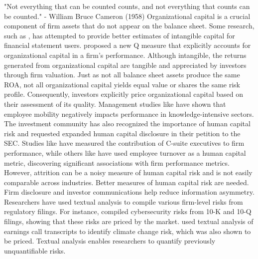 \documentclass[a4paper, 10pt, authoryear]{elsarticle}
\begin{document}
"Not everything that can be counted counts, and not everything that counts can be counted." - William Bruce Cameron (1958)
\newline
Organizational capital is a crucial component of firm assets that do not appear on the balance sheet. Some research, such as \cite{iqbalBetterEstimateInternally2024}, has attempted to provide better estimates of intangible capital for financial statement users. \cite{petersIntangibleCapitalInvestmentq2017} proposed a new Q measure that explicitly accounts for organizational capital in a firm's performance. Although intangible, the returns generated from organizational capital are tangible and appreciated by investors through firm valuation. Just as not all balance sheet assets produce the same ROA, not all organizational capital yields equal value or shares the same risk profile. Consequently, investors explicitly price organizational capital based on their assessment of its quality.
\newline
Management studies like \cite{campbellWhoLeavesWhere2012} have shown that employee mobility negatively impacts performance in knowledge-intensive sectors. The investment community has also recognized the importance of human capital risk and requested expanded human capital disclosure in their petition to the SEC. Studies like \cite{bennedsenCEOsMatterEvidence2020} have measured the contribution of C-suite executives to firm performance, while others like \cite{liEmployeeTurnoverFirm2022} have used employee turnover as a human capital metric, discovering significant associations with firm performance metrics. However, attrition can be a noisy measure of human capital risk and is not easily comparable across industries. Better measures of human capital risk are needed.
\newline
Firm disclosure and investor communications help reduce information asymmetry. Researchers have used textual analysis to compile various firm-level risks from regulatory filings. For instance, \cite{florackisCybersecurityRisk2023} compiled cybersecurity risks from 10-K and 10-Q filings, showing that these risks are priced by the market. \cite{sautnerFirmLevelClimateChange2023} used textual analysis of earnings call transcripts to identify climate change risk, which was also shown to be priced. Textual analysis enables researchers to quantify previously unquantifiable risks.
\end{document}
